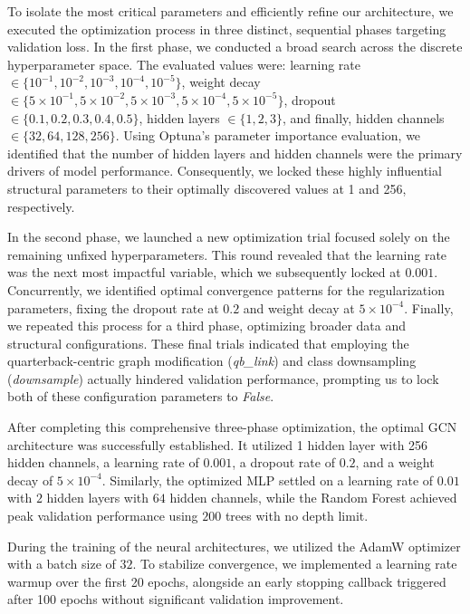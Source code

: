 \documentclass[runningheads]{llncs}
\begin{document}
To isolate the most critical parameters and efficiently refine our architecture, we executed the optimization process in three distinct, sequential phases targeting validation loss. In the first phase, we conducted a broad search across the discrete hyperparameter space. The evaluated values were: learning rate $\in \{10^{-1}, 10^{-2}, 10^{-3}, 10^{-4}, 10^{-5}\}$, weight decay $\in \{5 \times 10^{-1}, 5 \times 10^{-2}, 5 \times 10^{-3}, 5 \times 10^{-4}, 5 \times 10^{-5}\}$, dropout $\in \{0.1, 0.2, 0.3, 0.4, 0.5\}$, hidden layers $\in \{1, 2, 3\}$, and finally, hidden channels $\in \{32, 64, 128, 256\}$. Using Optuna's parameter importance evaluation, we identified that the number of hidden layers and hidden channels were the primary drivers of model performance. Consequently, we locked these highly influential structural parameters to their optimally discovered values at 1 and 256, respectively. 

In the second phase, we launched a new optimization trial focused solely on the remaining unfixed hyperparameters. This round revealed that the learning rate was the next most impactful variable, which we subsequently locked at $0.001$. Concurrently, we identified optimal convergence patterns for the regularization parameters, fixing the dropout rate at $0.2$ and weight decay at $5 \times 10^{-4}$. Finally, we repeated this process for a third phase, optimizing broader data and structural configurations. These final trials indicated that employing the quarterback-centric graph modification (\textit{qb\_link}) and class downsampling (\textit{downsample}) actually hindered validation performance, prompting us to lock both of these configuration parameters to \textit{False}.

After completing this comprehensive three-phase optimization, the optimal GCN architecture was successfully established. It utilized 1 hidden layer with 256 hidden channels, a learning rate of $0.001$, a dropout rate of $0.2$, and a weight decay of $5 \times 10^{-4}$. Similarly, the optimized MLP settled on a learning rate of $0.01$ with $2$ hidden layers with $64$ hidden channels, while the Random Forest achieved peak validation performance using $200$ trees with no depth limit.

During the training of the neural architectures, we utilized the AdamW optimizer with a batch size of $32$. To stabilize convergence, we implemented a learning rate warmup over the first 20 epochs, alongside an early stopping callback triggered after 100 epochs without significant validation improvement.
\end{document}

